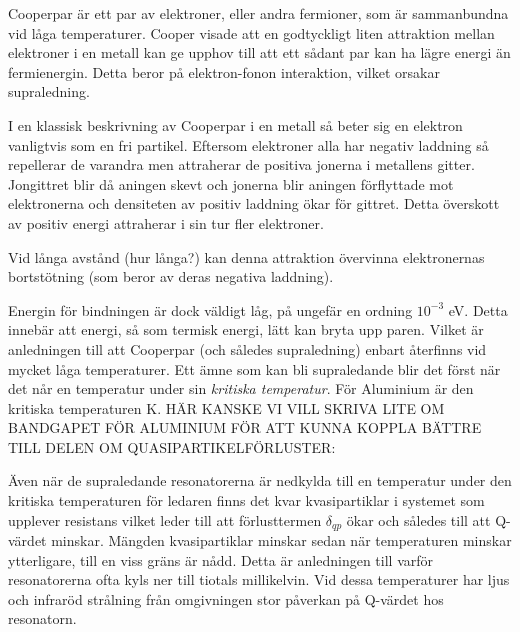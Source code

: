 \documentclass[main.tex]{subfiles}
\begin{document}
Cooperpar är ett par av elektroner, eller andra fermioner, som är sammanbundna vid låga temperaturer. Cooper visade att en godtyckligt liten attraktion mellan elektroner i en metall kan ge upphov till att ett sådant par kan ha lägre energi än fermienergin. Detta beror på elektron-fonon interaktion, vilket orsakar supraledning.

I en klassisk beskrivning av Cooperpar i en metall så beter sig en elektron vanligtvis som en fri partikel. Eftersom elektroner alla har negativ laddning så repellerar de varandra men attraherar de positiva jonerna i metallens gitter. Jongittret blir då aningen skevt och jonerna blir aningen förflyttade mot elektronerna och densiteten av positiv laddning ökar för gittret. Detta överskott av positiv energi attraherar i sin tur fler elektroner. 

Vid långa avstånd (hur långa?) kan denna attraktion övervinna elektronernas bortstötning (som beror av  deras negativa laddning).

Energin för bindningen är dock väldigt låg, på ungefär en ordning $10^{-3}$ eV.\cite{placeholder} Detta innebär att energi, så som termisk energi, lätt kan bryta upp paren. Vilket är anledningen till att Cooperpar (och således supraledning) enbart återfinns vid mycket låga temperaturer. Ett ämne som kan bli supraledande blir det först när det når en temperatur under sin \emph{kritiska temperatur}. För Aluminium är den kritiska temperaturen \unit[1,2]{K}. HÄR KANSKE VI VILL SKRIVA LITE OM BANDGAPET FÖR ALUMINIUM FÖR ATT KUNNA KOPPLA BÄTTRE TILL DELEN OM QUASIPARTIKELFÖRLUSTER:





Även när de supraledande resonatorerna är nedkylda till en temperatur under den kritiska temperaturen för ledaren finns det kvar kvasipartiklar i systemet som upplever resistans vilket leder till att förlusttermen $\delta_{qp}$ ökar och således till att Q-värdet minskar. Mängden kvasipartiklar minskar sedan när temperaturen minskar ytterligare, till en viss gräns är nådd\cite{Barends2011}. Detta är anledningen till varför resonatorerna ofta kyls ner till tiotals millikelvin. Vid dessa temperaturer har ljus och infraröd strålning från omgivningen stor påverkan på Q-värdet hos resonatorn\cite{Barends2011}.
\end{document}
